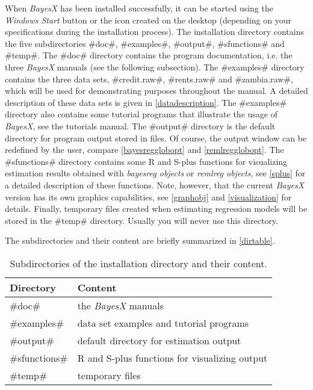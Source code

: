 When {\em BayesX} has been installed successfully, it can be
started using the {\em Windows Start} button or the icon created
on the desktop (depending on your specifications during the
installation process). The installation directory contains the
five subdirectories #doc#, #examples#, #output#, #sfunctions# and
#temp#. The #doc# directory contains the program documentation,
i.e. the three {\em BayesX} manuals (see the following
subsection). The #examples# directory contains the three data
sets, #credit.raw#, #rents.raw# and #zambia.raw#, which will be
used for demonstrating purposes throughout the manual. A detailed
description of these data sets is given in
\autoref{datadescription}. The #examples# directory also contains
some tutorial programs that illustrate the usage of {\em BayesX},
see the tutorials manual. The #output# directory is the default
directory for program output stored in files. Of course, the
output window can be redefined by the user, compare
\autoref{bayesregglobopt} and \autoref{remlregglobopt}. The
#sfunctions# directory contains some R and S-plus functions for
visualizing estimation results obtained with {\em bayesreg
objects} or {\em remlreg objects}, see \autoref{splus} for a
detailed description of these functions. Note, however, that the
current {\em BayesX} version has its own graphics capabilities,
see \autoref{graphobj} and \autoref{visualization} for details.
Finally, temporary files created when estimating regression models
will be stored in the #temp# directory. Usually you will never use
this directory.

The subdirectories and their content are briefly summarized in
\autoref{dirtable}.

\begin{table}[ht]
\begin{center}
\begin{tabular}{|l|l|}
\hline
Directory & Content \\
\hline
#doc# & the {\em BayesX} manuals \\
#examples# & data set examples and tutorial programs \\
#output# & default directory for estimation output \\
#sfunctions# & R and S-plus functions for visualizing output \\
#temp# & temporary files \\
\hline
\end{tabular}
{\em\caption{ \label{dirtable} Subdirectories of the installation
directory and their content.}}
\end{center}
\end{table}

